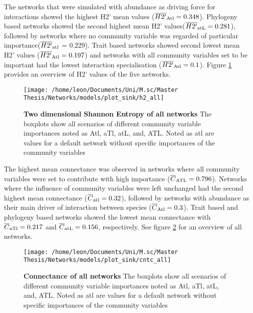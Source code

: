 \documentclass[12pt,a4paper]{article}
\begin{document}
The networks that were simulated with abundance as driving force for interactions showed the highest H2' mean values ($\overline{H2'}\textsubscript{Atl} = 0.348$). Phylogeny based networks showed the second highest mean H2' values($\overline{H2'}\textsubscript{atL} = 0.281$), followed by networks where no community variable was regarded of particular importance($\overline{H2'}\textsubscript{atl}$ = 0.229). Trait based networks showed second lowest mean H2' values ($\overline{H2'}\textsubscript{Atl} = 0.197$) and networks with all community variables set to be important had the lowest interaction specialisation ($\overline{H2'}\textsubscript{Atl} = 0.1$). Figure \ref{fig:h2} provides an overview of H2' values of the five networks.
\begin{figure}[H]
	 \texttt{[image: /home/leon/Documents/Uni/M.sc/Master Thesis/Networks/models/plot\_sink/h2\_all]}
	 \caption{\textbf{Two dimensional Shannon Entropy of all networks} The boxplots show all scenarios of different community variable importances noted as Atl, aTl, atL, and, ATL. Noted as atl are values for a default network without specific importances of the community variables}
	 \label{fig:h2}
\end{figure}


The highest mean connectance was observed in networks where all community variables were set to contribute with high importance ($\overline{C}\textsubscript{ATL} = 0.796$). Networks where the influence of community variables were left unchanged had the second highest mean connectance ($\overline{C}\textsubscript{atl} = 0.32$), followed by networks with abundance as their main driver of interaction between species ($\overline{C}\textsubscript{Atl} = 0.3$). Trait based and phylogeny based networks showed the lowest mean connectance with $\overline{C}\textsubscript{aTl} = 0.217$ and $\overline{C}\textsubscript{atL} = 0.156$, respectively. See figure \ref{fig:cntc} for an overview of all networks.
\begin{figure}[H]
	 \texttt{[image: /home/leon/Documents/Uni/M.sc/Master Thesis/Networks/models/plot\_sink/cntc\_all]}
	 \caption{\textbf{Connectance of all networks} The boxplots show all scenarios of different community variable importances noted as Atl, aTl, atL, and, ATL. Noted as atl are values for a default network without specific importances of the community variables}
	 \label{fig:cntc}
\end{figure}

\end{document}
